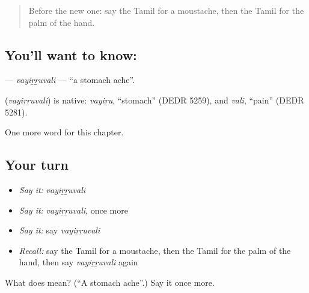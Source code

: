 \label{lesson:TA-C201-vayirruvali}



\begin{quote}
Before the new one: say the Tamil for a moustache, then the Tamil for the palm of the hand.
\end{quote}

\subsection*{You'll want to know: }
\textbf{} — \emph{vayiṟṟuvali} — \textquotedblleft{}a stomach ache\textquotedblright{}.

\begin{cousinweb}
\textbf{} (\emph{vayiṟṟuvali}) is native: \emph{vayiṟu}, \textquotedblleft{}stomach\textquotedblright{} (DEDR 5259), and \emph{vali}, \textquotedblleft{}pain\textquotedblright{} (DEDR 5281).
\end{cousinweb}

\begin{grammarlens}[title={What you've built}]
One more word for this chapter.
\end{grammarlens}

\subsection*{Your turn}
\begin{itemize}
\raggedright
  \item \emph{Say it:} \emph{vayiṟṟuvali}
  \item \emph{Say it:} \emph{vayiṟṟuvali}, once more
  \item \emph{Say it:} say \emph{vayiṟṟuvali}
  \item \emph{Recall:} say the Tamil for a moustache, then the Tamil for the palm of the hand, then say \emph{vayiṟṟuvali} again
\end{itemize}

\begin{tcolorbox}[breakable,colback=teal!4,colframe=teal!35!black,title={Before you move on}]
What does  mean? (\textquotedblleft{}A stomach ache\textquotedblright{}.) Say it once more.
\end{tcolorbox}
